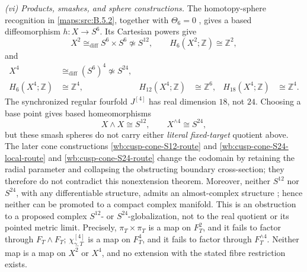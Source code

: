 \begin{theorem}
\smallskip
\noindent
\emph{(vi) Products, smashes, and sphere constructions.}
The homotopy-sphere recognition in \cref{maps:src:B.5.2}, together with $\Theta_6=0$ \cite[Theorem~5.1 and table, p.~512]{manKM63}, gives a based diffeomorphism $h:X\to S^6$. Its Cartesian powers give
\begin{equation}
 X^2\cong_{\mathrm{diff}}S^6\times S^6\not\simeq S^{12},\qquad
 H_6(X^2;\mathbb Z)\cong\mathbb Z^2,
 \label{wb:cusp-spec-product-not-sphere}
\end{equation}
and
\begin{equation}
 \begin{aligned}
 X^4&\cong_{\mathrm{diff}}(S^6)^4\not\simeq S^{24},\\
 H_6(X^4;\mathbb Z)&\cong\mathbb Z^4,&
 H_{12}(X^4;\mathbb Z)&\cong\mathbb Z^6,&
 H_{18}(X^4;\mathbb Z)&\cong\mathbb Z^4.
 \end{aligned}
 \label{wb:cusp-spec-four-product-not-sphere}
\end{equation}
The synchronized regular fourfold \(J^{[4]}\) has real dimension \(18\),
not \(24\).  Choosing a base point gives based homeomorphisms
\begin{equation}
X\wedge X\cong S^{12},\qquad X^{\wedge4}\cong S^{24},
\label{wb:cusp-spec-smash-spheres}
\end{equation}
but these smash spheres do not carry either \emph{literal fixed-target}
quotient above.  The later cone constructions
\cref{wb:cusp-cone-S12-route} and \cref{wb:cusp-cone-S24-local-route} and \cref{wb:cusp-cone-S24-route}
change the codomain by retaining the radial parameter and collapsing the
obstructing boundary cross-section; they therefore do not contradict this
nonextension theorem.  Moreover,
neither \(S^{12}\) nor \(S^{24}\), with any differentiable structure,
admits an almost-complex structure
\cite[\S15, Proposition~15.1 and the following remark,
p.~434]{BorelSerre1953}; hence neither can be promoted to a compact
complex manifold.  This is an obstruction to a proposed complex
\(S^{12}\)- or \(S^{24}\)-globalization, not to the real quotient or its
pointed metric limit.  Precisely,
\(\pi_T\times\pi_T\) is a map on \(F_T^2\), and it fails to factor
through \(F_T\wedge F_T\); \(\chi_{\gamma,T}^{[4]}\) is a map on
\(F_T^4\), and it fails to factor through \(F_T^{\wedge4}\).
Neither map is a map on \(X^2\) or \(X^4\), and no extension with the
stated fibre restriction exists.


\end{theorem}
